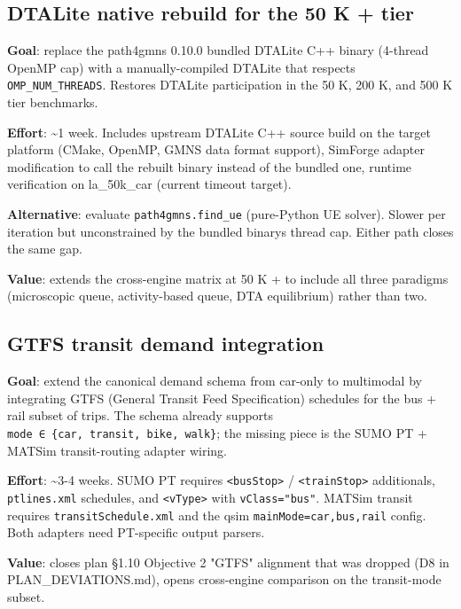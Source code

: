 \subsection{DTALite native rebuild for the 50 K +
tier}\label{652-dtalite-native-rebuild-for-the-50-k--tier}

\textbf{Goal}: replace the path4gmns 0.10.0 bundled DTALite C++ binary
(4-thread OpenMP cap) with a manually-compiled DTALite that respects
\texttt{OMP\_NUM\_THREADS}. Restores DTALite participation in the 50 K,
200 K, and 500 K tier benchmarks.

\textbf{Effort}: \textasciitilde1 week. Includes upstream DTALite C++
source build on the target platform (CMake, OpenMP, GMNS data format
support), SimForge adapter modification to call the rebuilt binary
instead of the bundled one, runtime verification on la\_50k\_car
(current timeout target).

\textbf{Alternative}: evaluate \texttt{path4gmns.find\_ue} (pure-Python
UE solver). Slower per iteration but unconstrained by the bundled
binary\textquotesingle s thread cap. Either path closes the same gap.

\textbf{Value}: extends the cross-engine matrix at 50 K + to include all
three paradigms (microscopic queue, activity-based queue, DTA
equilibrium) rather than two.

\subsection{GTFS transit demand
integration}\label{653-gtfs-transit-demand-integration}

\textbf{Goal}: extend the canonical demand schema from car-only to
multimodal by integrating GTFS (General Transit Feed Specification)
schedules for the bus + rail subset of trips. The schema already
supports \texttt{mode\ ∈\ \{car,\ transit,\ bike,\ walk\}}; the missing
piece is the SUMO PT + MATSim transit-routing adapter wiring.

\textbf{Effort}: \textasciitilde3-4 weeks. SUMO PT requires
\texttt{\textless{}busStop\textgreater{}} /
\texttt{\textless{}trainStop\textgreater{}} additionals,
\texttt{ptlines.xml} schedules, and
\texttt{\textless{}vType\textgreater{}} with \texttt{vClass="bus"}.
MATSim transit requires \texttt{transitSchedule.xml} and the qsim
\texttt{mainMode=car,bus,rail} config. Both adapters need PT-specific
output parsers.

\textbf{Value}: closes plan §1.10 Objective 2 "GTFS" alignment that
was dropped (D8 in PLAN\_DEVIATIONS.md), opens cross-engine
comparison on the transit-mode subset.

